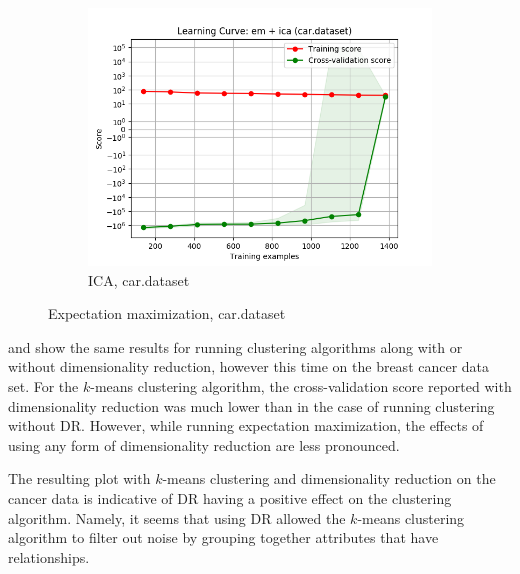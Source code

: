 \documentclass{article}
\begin{document}
\begin{figure}[htb]
\begin{subfigure}{0.33\textwidth}
        \includegraphics[width=\linewidth]{out/cluster_dr/car-em-ica-learning.png}
        \caption{ICA, car.dataset}
      \end{subfigure}

    \caption{Expectation maximization, car.dataset}
    \label{fig:cdr-plot-em-car}
    \end{figure}
    
     and  show the same results for running clustering algorithms along with or without dimensionality reduction, however this time on the breast cancer data set. For the $k$-means clustering algorithm, the cross-validation score reported with dimensionality reduction was much lower than in the case of running clustering without DR. However, while running expectation maximization, the effects of using any form of dimensionality reduction are less pronounced.

    The resulting plot with $k$-means clustering and dimensionality reduction on the cancer data is indicative of DR having a positive effect on the clustering algorithm. Namely, it seems that using DR allowed the $k$-means clustering algorithm to filter out noise by grouping together attributes that have relationships.
\end{document}
